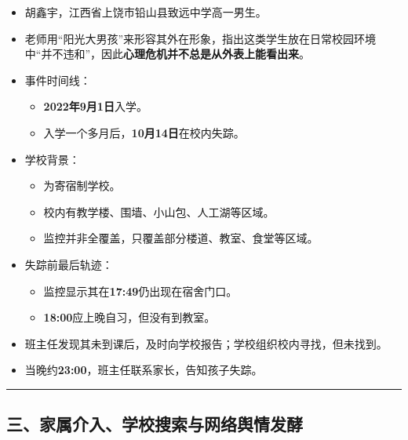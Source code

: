 \documentclass[
  chinese,
  9pt,
  a4paper,
]{ctexart}
\providecommand{\tightlist}{%
  \setlength{\itemsep}{0pt}\setlength{\parskip}{0pt}}
\begin{document}
\begin{itemize}
\item
  胡鑫宇，江西省上饶市铅山县致远中学高一男生。
\item
  老师用``阳光大男孩''来形容其外在形象，指出这类学生放在日常校园环境中``并不违和''，因此\textbf{心理危机并不总是从外表上能看出来}。
\item
  事件时间线：

  \begin{itemize}
  \tightlist
  \item
    \textbf{2022年9月1日}入学。
  \item
    入学一个多月后，\textbf{10月14日}在校内失踪。
  \end{itemize}
\item
  学校背景：

  \begin{itemize}
  \tightlist
  \item
    为寄宿制学校。
  \item
    校内有教学楼、围墙、小山包、人工湖等区域。
  \item
    监控并非全覆盖，只覆盖部分楼道、教室、食堂等区域。
  \end{itemize}
\item
  失踪前最后轨迹：

  \begin{itemize}
  \tightlist
  \item
    监控显示其在\textbf{17:49}仍出现在宿舍门口。
  \item
    \textbf{18:00}应上晚自习，但没有到教室。
  \end{itemize}
\item
  班主任发现其未到课后，及时向学校报告；学校组织校内寻找，但未找到。
\item
  当晚约\textbf{23:00}，班主任联系家长，告知孩子失踪。
\end{itemize}

\begin{center}\rule{0.5\linewidth}{0.5pt}\end{center}

\subsection{三、家属介入、学校搜索与网络舆情发酵}\label{ux4e09ux5bb6ux5c5eux4ecbux5165ux5b66ux6821ux641cux7d22ux4e0eux7f51ux7edcux8206ux60c5ux53d1ux9175}
\end{document}

